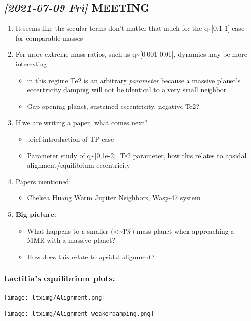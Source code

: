 \documentclass[11pt]{article}
\begin{document}
\subsection{\textit{[2021-07-09 Fri] } MEETING}
\label{sec:orgc1afabe}
\begin{enumerate}
\item It seems like the secular terms don't matter that much for the
q\textasciitilde{}[0.1-1] case for comparable masses
\item For more extreme mass ratios, such as q\textasciitilde{}[0.001-0.01], dynamics may
be more interesting
\begin{itemize}
\item in this regime Te2 is an arbitrary \emph{parameter} because a massive
planet's eccentricity damping will not be identical to a very
small neighbor
\item Gap opening planet, sustained eccentricity, negative Te2?
\end{itemize}
\item If we are writing a paper, what comes next?
\begin{itemize}
\item brief introduction of TP case
\item Parameter study of q\textasciitilde{}[0,1e-2], Te2 parameter, how this relates to
apsidal alignment/equilibrium eccentricity
\end{itemize}
\item Papers mentioned:
\begin{itemize}
\item Chelsea Huang Warm Jupiter Neighbors, Wasp-47 system
\end{itemize}
\item \textbf{Big picture}:
\begin{itemize}
\item What happens to a smaller (<\textasciitilde{}1\%) mass planet when approaching a MMR with a massive planet?
\item How does this relate to apsidal alignment?
\end{itemize}
\end{enumerate}
\subsubsection{Laetitia's equilibrium plots:}
\label{sec:orgea52c29}
\begin{center}
\texttt{[image: ltximg/Alignment.png]}
\end{center}
\begin{center}
\texttt{[image: ltximg/Alignment\_weakerdamping.png]}
\end{center}
\end{document}

